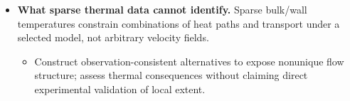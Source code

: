\begin{itemize}[leftmargin=*]
\begin{itemize}
\item Compare an effective closure, two-zone exchange, local correction and richer reconstruction only against a declared thermal target and complexity/\allowbreak{}cost criterion.
\end{itemize}
\item {}\textbf{What sparse thermal data cannot identify.} Sparse bulk/\allowbreak{}wall temperatures constrain combinations of heat paths and transport under a selected model, not arbitrary velocity fields.\cite{oliver2014unobserved}
\begin{itemize}
\item Construct observation-consistent alternatives to expose nonunique flow structure; assess thermal consequences without claiming direct experimental validation of local extent.
\end{itemize}
\end{itemize}
